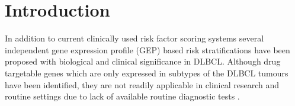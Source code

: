 \documentclass[10pt]{bmc_article}
\newenvironment{bmcformat}{\fussy\setboolean{publ}{true}}{\fussy}
\begin{document}
\begin{bmcformat}





\section*{Introduction}

In addition to current clinically used risk factor scoring systems several independent gene expression profile (GEP) based risk stratifications have been proposed with biological and clinical significance in DLBCL. Although drug targetable genes which are only expressed in subtypes of the DLBCL tumours have been identified, they are not readily applicable in clinical research and routine settings due to lack of available routine diagnostic tests \cite{Jaffe2009}.


\end{bmcformat}
\end{document}
